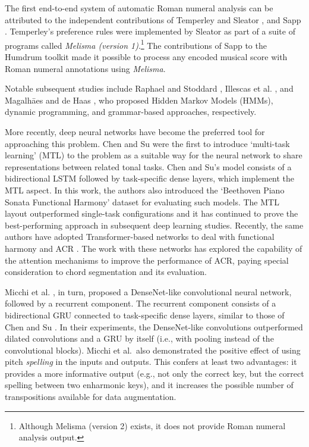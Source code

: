 


The first end-to-end system of automatic Roman numeral
analysis can be attributed to the independent contributions
of Temperley and Sleator \parencite{temperley2004cognition}, and
Sapp \parencite{sapp2009tsroot}. Temperley's preference rules
were implemented by Sleator as part of a suite of programs
called \emph{Melisma (version 1)}.\footnote{Although Melisma
(version 2) exists, it does not provide Roman numeral
analysis output.} The contributions of Sapp to the Humdrum
toolkit \parencite{huron2002music} made it possible to process
any encoded musical score with Roman numeral annotations
using \emph{Melisma}.

Notable subsequent studies include Raphael and Stoddard
\parencite{raphael2004functional}, Illescas et al.
\parencite{illescas2007harmonic}, and Magalh\=aes and de Haas
\parencite{magalhaes2011functional}, who proposed Hidden Markov
Models (HMMs), dynamic programming, and grammar-based
approaches, respectively.

More recently, deep neural networks have become the
preferred tool for approaching this problem. Chen and Su
\parencite{chen2018functional} were the first to introduce
`multi-task learning' (MTL) \parencite{ruder2017overview} to the
problem as a suitable way for the neural network to share
representations between related tonal tasks. Chen and Su's
model consists of a bidirectional LSTM
\parencite{hochreiter1997long} followed by task-specific dense
layers, which implement the MTL aspect. In this work, the
authors also introduced the `Beethoven Piano Sonata
Functional Harmony' dataset for evaluating such models. The
MTL layout outperformed single-task configurations and it
has continued to prove the best-performing approach in
subsequent deep learning studies. Recently, the same authors
have adopted Transformer-based networks to deal with
functional harmony and ACR \parencite{chen2019harmony,
chen2021attend}. The work with these networks has explored
the capability of the attention mechanisms to improve the
performance of ACR, paying special consideration to chord
segmentation and its evaluation.

Micchi et al. \parencite{micchi2020not}, in turn, proposed a
DenseNet-like \parencite{huang2017densely} convolutional neural
network, followed by a recurrent component. The recurrent
component consists of a bidirectional GRU
\parencite{cho2014learning} connected to task-specific dense
layers, similar to those of Chen and Su
\parencite{chen2018functional}. In their experiments, the
DenseNet-like convolutions outperformed dilated convolutions
and a GRU by itself (i.e., with pooling instead of the
convolutional blocks). Micchi et al.~also demonstrated the
positive effect of using pitch \textit{spelling} in the
inputs and outputs. This confers at least two advantages: it
provides a more informative output (e.g., not only the
correct key, but the correct spelling between two enharmonic
keys), and it increases the possible number of
transpositions available for data augmentation.
